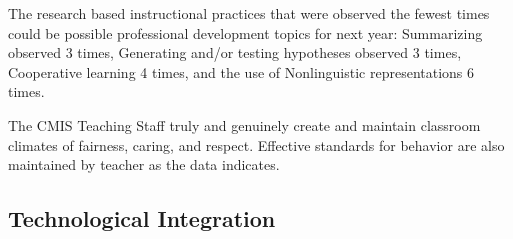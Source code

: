 \begin{findings}

The research based instructional practices that were observed the fewest times could be possible professional development topics for next year: 
Summarizing observed 3 times, Generating and/or testing hypotheses observed 3 times, Cooperative learning 4 times, and the use of  Nonlinguistic representations 6 times. 


The CMIS Teaching Staff truly and genuinely create and maintain classroom climates of fairness, caring, and respect. Effective standards for behavior are also maintained by teacher as the data indicates. 
\end{findings}

\subsection{Technological Integration}



